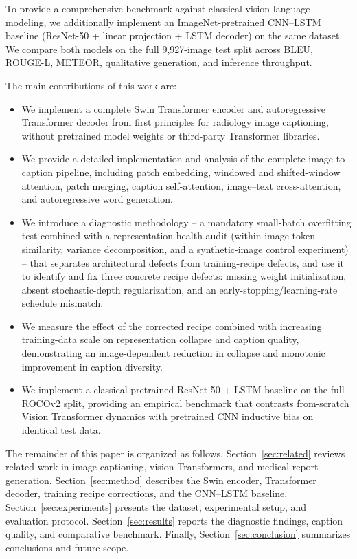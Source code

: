 \documentclass[conference]{IEEEtran}
\begin{document}
To provide a comprehensive benchmark against classical vision-language modeling, we additionally implement an ImageNet-pretrained CNN--LSTM baseline (ResNet-50 + linear projection + LSTM decoder) on the same dataset. We compare both models on the full 9,927-image test split across BLEU, ROUGE-L, METEOR, qualitative generation, and inference throughput.

The main contributions of this work are:
\begin{itemize}
    \item We implement a complete Swin Transformer encoder and autoregressive Transformer decoder from first principles for radiology image captioning, without pretrained model weights or third-party Transformer libraries.
    \item We provide a detailed implementation and analysis of the complete image-to-caption pipeline, including patch embedding, windowed and shifted-window attention, patch merging, caption self-attention, image--text cross-attention, and autoregressive word generation.
    \item We introduce a diagnostic methodology -- a mandatory small-batch overfitting test combined with a representation-health audit (within-image token similarity, variance decomposition, and a synthetic-image control experiment) -- that separates architectural defects from training-recipe defects, and use it to identify and fix three concrete recipe defects: missing weight initialization, absent stochastic-depth regularization, and an early-stopping/learning-rate schedule mismatch.
    \item We measure the effect of the corrected recipe combined with increasing training-data scale on representation collapse and caption quality, demonstrating an image-dependent reduction in collapse and monotonic improvement in caption diversity.
    \item We implement a classical pretrained ResNet-50 + LSTM baseline on the full ROCOv2 split, providing an empirical benchmark that contrasts from-scratch Vision Transformer dynamics with pretrained CNN inductive bias on identical test data.
\end{itemize}

The remainder of this paper is organized as follows. Section~\ref{sec:related} reviews related work in image captioning, vision Transformers, and medical report generation. Section~\ref{sec:method} describes the Swin encoder, Transformer decoder, training recipe corrections, and the CNN--LSTM baseline. Section~\ref{sec:experiments} presents the dataset, experimental setup, and evaluation protocol. Section~\ref{sec:results} reports the diagnostic findings, caption quality, and comparative benchmark. Finally, Section~\ref{sec:conclusion} summarizes conclusions and future scope.
\end{document}
